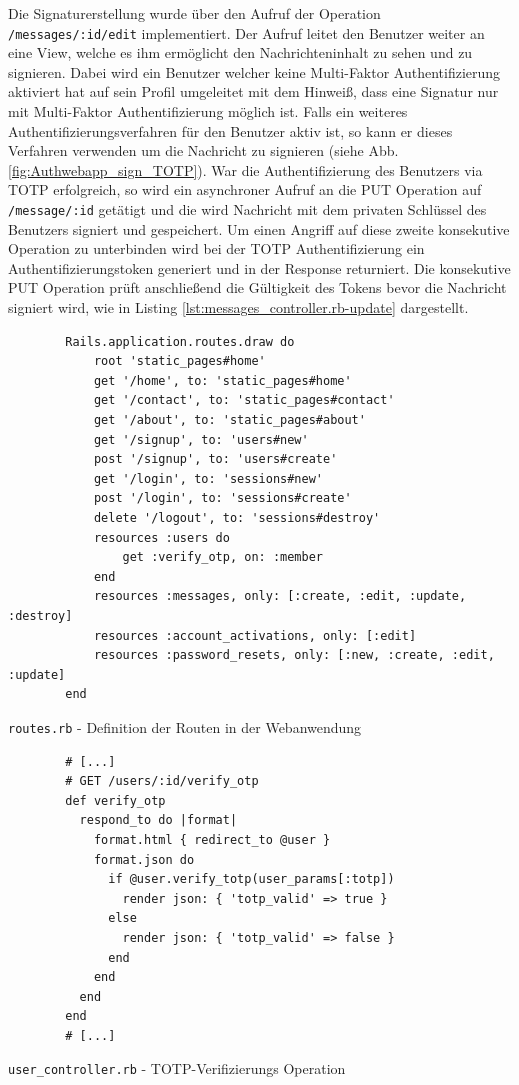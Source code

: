 \documentclass[11pt,a4paper,ngerman]{scrreprt}
\begin{document}
Die Signaturerstellung wurde über den Aufruf der Operation \texttt{/messages/:id/edit} implementiert. Der Aufruf leitet den Benutzer weiter an eine View, welche es ihm ermöglicht den Nachrichteninhalt zu sehen und zu signieren. Dabei wird ein Benutzer welcher keine Multi-Faktor Authentifizierung aktiviert hat auf sein Profil umgeleitet mit dem Hinweiß, dass eine Signatur nur mit Multi-Faktor Authentifizierung möglich ist. Falls ein weiteres Authentifizierungsverfahren für den Benutzer aktiv ist, so kann er dieses Verfahren verwenden um die Nachricht zu signieren (siehe Abb. \ref{fig:Authwebapp_sign_TOTP}). War die Authentifizierung des Benutzers via TOTP erfolgreich, so wird ein asynchroner Aufruf an die PUT Operation auf \texttt{/message/:id} getätigt und die wird Nachricht mit dem privaten Schlüssel des Benutzers signiert und gespeichert. Um einen Angriff auf diese zweite konsekutive Operation zu unterbinden wird bei der TOTP Authentifizierung ein Authentifizierungstoken generiert und in der Response returniert. Die konsekutive PUT Operation prüft anschließend die Gültigkeit des Tokens bevor die Nachricht signiert wird, wie in Listing \ref{lst:messages_controller.rb-update} dargestellt.
\begin{listing}[htpb]
    \begin{verbatim}
        Rails.application.routes.draw do
            root 'static_pages#home'
            get '/home', to: 'static_pages#home'
            get '/contact', to: 'static_pages#contact'
            get '/about', to: 'static_pages#about'
            get '/signup', to: 'users#new'
            post '/signup', to: 'users#create'
            get '/login', to: 'sessions#new'
            post '/login', to: 'sessions#create'
            delete '/logout', to: 'sessions#destroy'
            resources :users do
                get :verify_otp, on: :member
            end
            resources :messages, only: [:create, :edit, :update, :destroy]
            resources :account_activations, only: [:edit]
            resources :password_resets, only: [:new, :create, :edit, :update]
        end
    \end{verbatim}
    \caption{\texttt{routes.rb} - Definition der Routen in der Webanwendung}
    \label{lst:routes.rb}
\end{listing}

\begin{listing}[htpb]
    \begin{verbatim}
        # [...]
        # GET /users/:id/verify_otp
        def verify_otp
          respond_to do |format|
            format.html { redirect_to @user }
            format.json do
              if @user.verify_totp(user_params[:totp])
                render json: { 'totp_valid' => true }
              else
                render json: { 'totp_valid' => false }
              end
            end
          end
        end
        # [...]
    \end{verbatim}
    \caption{\texttt{user\_controller.rb} - TOTP-Verifizierungs Operation}
    \label{lst:user-controller.rb-verify-otp}
\end{listing}
\end{document}
